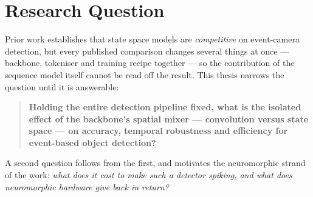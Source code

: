 \documentclass[11pt, a4paper]{report}
\begin{document}


\section{Research Question}
\label{sec:rq}
Prior work establishes that state space models are \emph{competitive} on event-camera detection, but
every published comparison changes several things at once --- backbone, tokeniser and training recipe
together --- so the contribution of the sequence model itself cannot be read off the result. This
thesis narrows the question until it is answerable:

\begin{quote}
\textbf{Holding the entire detection pipeline fixed, what is the isolated effect of the backbone's
spatial mixer --- convolution versus state space --- on accuracy, temporal robustness and efficiency
for event-based object detection?}
\end{quote}

A second question follows from the first, and motivates the neuromorphic strand of the work:
\emph{what does it cost to make such a detector spiking, and what does neuromorphic hardware give back
in return?}
\end{document}
